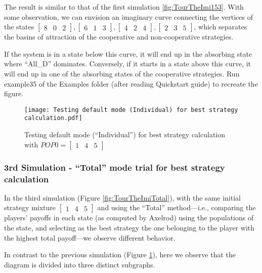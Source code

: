 The result is similar to that of the first simulation \ref{fig:TourTheImi153}. With some observation, we can envision an imaginary curve connecting the vertices of the states $\begin{bmatrix}8 & 0 & 2\end{bmatrix}, \begin{bmatrix}6 & 1 & 3\end{bmatrix}, \begin{bmatrix}4 & 2 & 4\end{bmatrix}, \begin{bmatrix}2 & 3 & 5\end{bmatrix}$, which separates the basins of attraction of the cooperative and non-cooperative strategies. 

If the system is in a state below this curve, it will end up in the absorbing state where ``All\_D'' dominates. Conversely, if it starts in a state above this curve, it will end up in one of the absorbing states of the cooperative strategies. Run example35 of the Examples folder (after reading Quickstart guide) to recreate the figure.

	\begin{figure}[h]
	      \centering
	      \texttt{[image: Testing default mode (Individual) for best strategy calculation.pdf]}
	      \caption{Testing default mode (``Individual'') for best strategy calculation with $POP0=\begin{bmatrix}1&4&5\end{bmatrix}$}
	      \label{fig:TourTheImiIndividual}
	\end{figure}
\subsubsection{3rd Simulation - ``Total'' mode trial for best strategy calculation}
In the third simulation (Figure \ref{fig:TourTheImiTotal}), with the same initial strategy mixture $\begin{bmatrix}1 & 4 & 5\end{bmatrix}$ and using the ``Total'' method—i.e., comparing the players' payoffs in each state (as computed by Axelrod) using the populations of the state, and selecting as the best strategy the one belonging to the player with the highest total payoff—we observe different behavior.

In contrast to the previous simulation (Figure \ref{fig:TourTheImiIndividual}), here we observe that the diagram is divided into three distinct subgraphs.

